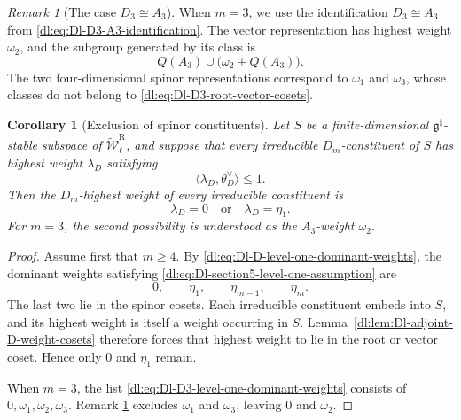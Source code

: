 \documentclass[11pt,reqno]{amsart}
\newtheorem{corollary}[theorem]{Corollary}
\theoremstyle{definition}
\theoremstyle{remark}
\newtheorem{remark}[theorem]{Remark}
\begin{document}
\begin{remark}[The case \(D_3\cong A_3\)]
\label{dl:rem:Dl-D3-weight-cosets}
When \(m=3\), we use the identification
\(D_3\cong A_3\) from
\eqref{dl:eq:Dl-D3-A3-identification}.  The vector representation has
highest weight \(\omega_2\), and the subgroup generated by its class is
\begin{equation}
  Q(A_3)
  \cup
  \bigl(\omega_2+Q(A_3)\bigr).
  \label{dl:eq:Dl-D3-root-vector-cosets}
\end{equation}
The two four-dimensional spinor representations correspond to
\(\omega_1\) and \(\omega_3\), whose classes do not belong to
\eqref{dl:eq:Dl-D3-root-vector-cosets}.
\end{remark}

\begin{corollary}[Exclusion of spinor constituents]
\label{dl:cor:Dl-spinor-constituents-excluded}
Let \(S\) be a finite-dimensional
\(\mathfrak g^\natural\)-stable subspace of
\(\widetilde{\mathcal W}_\ell^{\mathrm R}\), and suppose that every
irreducible \(D_m\)-constituent of \(S\) has highest weight
\(\lambda_D\) satisfying
\begin{equation}
  \langle\lambda_D,\theta_D^\vee\rangle\le1.
  \label{dl:eq:Dl-section5-level-one-assumption}
\end{equation}
Then the \(D_m\)-highest weight of every irreducible constituent is
\begin{equation*}
  \lambda_D=0
  \quad\text{or}\quad
  \lambda_D=\eta_1.
\end{equation*}
For \(m=3\), the second possibility is understood as the
\(A_3\)-weight \(\omega_2\).
\end{corollary}

\begin{proof}
Assume first that \(m\ge4\).  By
\eqref{dl:eq:Dl-D-level-one-dominant-weights}, the dominant weights
satisfying \eqref{dl:eq:Dl-section5-level-one-assumption} are
\[
  0,\qquad
  \eta_1,\qquad
  \eta_{m-1},\qquad
  \eta_m.
\]
The last two lie in the spinor cosets.  Each irreducible constituent
embeds into $S$, and its highest weight is itself a weight occurring in
$S$.  Lemma~\ref{dl:lem:Dl-adjoint-D-weight-cosets} therefore forces that
highest weight to lie in the root or vector coset.  Hence only \(0\) and
\(\eta_1\) remain.

When \(m=3\), the list
\eqref{dl:eq:Dl-D3-level-one-dominant-weights} consists of
\(0,\omega_1,\omega_2,\omega_3\).  Remark
\ref{dl:rem:Dl-D3-weight-cosets} excludes
\(\omega_1\) and \(\omega_3\), leaving \(0\) and \(\omega_2\).
\end{proof}
\end{document}
